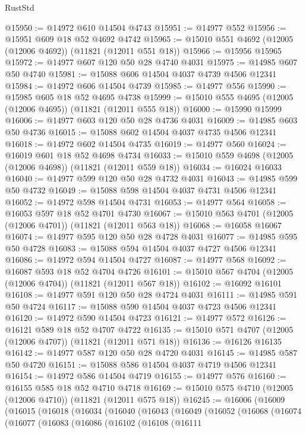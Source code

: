 \begin{lexlean}{RustStd}
\begin{coremodule}
@15950 := @14972 @610 @14504 @4743
@15951 := @14977 @552
@15956 := @15951 @609 @18 @52 @4692 @4742
@15965 := @15010 @551 @4692 (@12005 (@12006 @4692)) (@11821 (@12011 @551 @18))
@15966 := @15956 @15965
@15972 := @14977 @607 @120 @50 @28 @4740 @4031
@15975 := @14985 @607 @50 @4740
@15981 := @15088 @606 @14504 @4037 @4739 @4506 @12341
@15984 := @14972 @606 @14504 @4739
@15985 := @14977 @556
@15990 := @15985 @605 @18 @52 @4695 @4738
@15999 := @15010 @555 @4695 (@12005 (@12006 @4695)) (@11821 (@12011 @555 @18))
@16000 := @15990 @15999
@16006 := @14977 @603 @120 @50 @28 @4736 @4031
@16009 := @14985 @603 @50 @4736
@16015 := @15088 @602 @14504 @4037 @4735 @4506 @12341
@16018 := @14972 @602 @14504 @4735
@16019 := @14977 @560
@16024 := @16019 @601 @18 @52 @4698 @4734
@16033 := @15010 @559 @4698 (@12005 (@12006 @4698)) (@11821 (@12011 @559 @18))
@16034 := @16024 @16033
@16040 := @14977 @599 @120 @50 @28 @4732 @4031
@16043 := @14985 @599 @50 @4732
@16049 := @15088 @598 @14504 @4037 @4731 @4506 @12341
@16052 := @14972 @598 @14504 @4731
@16053 := @14977 @564
@16058 := @16053 @597 @18 @52 @4701 @4730
@16067 := @15010 @563 @4701 (@12005 (@12006 @4701)) (@11821 (@12011 @563 @18))
@16068 := @16058 @16067
@16074 := @14977 @595 @120 @50 @28 @4728 @4031
@16077 := @14985 @595 @50 @4728
@16083 := @15088 @594 @14504 @4037 @4727 @4506 @12341
@16086 := @14972 @594 @14504 @4727
@16087 := @14977 @568
@16092 := @16087 @593 @18 @52 @4704 @4726
@16101 := @15010 @567 @4704 (@12005 (@12006 @4704)) (@11821 (@12011 @567 @18))
@16102 := @16092 @16101
@16108 := @14977 @591 @120 @50 @28 @4724 @4031
@16111 := @14985 @591 @50 @4724
@16117 := @15088 @590 @14504 @4037 @4723 @4506 @12341
@16120 := @14972 @590 @14504 @4723
@16121 := @14977 @572
@16126 := @16121 @589 @18 @52 @4707 @4722
@16135 := @15010 @571 @4707 (@12005 (@12006 @4707)) (@11821 (@12011 @571 @18))
@16136 := @16126 @16135
@16142 := @14977 @587 @120 @50 @28 @4720 @4031
@16145 := @14985 @587 @50 @4720
@16151 := @15088 @586 @14504 @4037 @4719 @4506 @12341
@16154 := @14972 @586 @14504 @4719
@16155 := @14977 @576
@16160 := @16155 @585 @18 @52 @4710 @4718
@16169 := @15010 @575 @4710 (@12005 (@12006 @4710)) (@11821 (@12011 @575 @18))
@16245 := @16006
    (@16009
      (@16015
        (@16018
          (@16034
            (@16040
              (@16043
                (@16049
                  (@16052
                    (@16068
                      (@16074
                        (@16077
                          (@16083
                            (@16086
                              (@16102
                                (@16108
                                  (@16111

\end{coremodule}
\end{lexlean}
